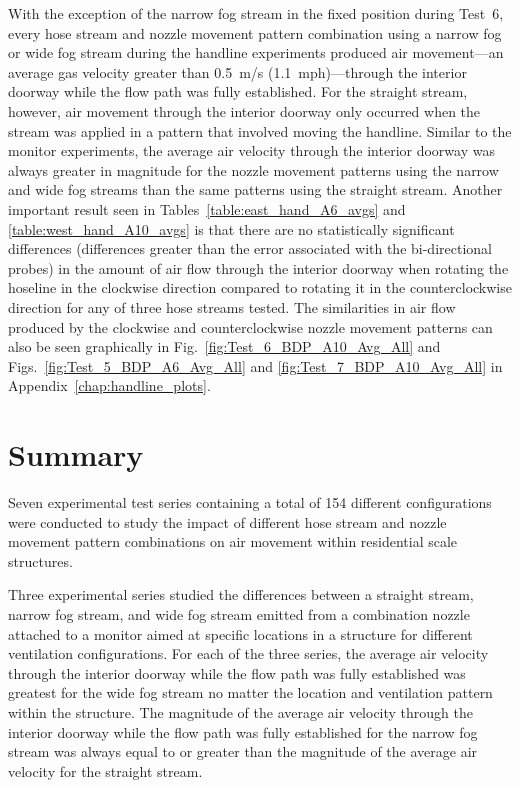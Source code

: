 \documentclass[12pt,oneside]{book}
\begin{document}
With the exception of the narrow fog stream in the fixed position during Test~6, every hose stream and nozzle movement pattern combination using a narrow fog or wide fog stream during the handline experiments produced air movement---an average gas velocity greater than 0.5~m/s (1.1~mph)---through the interior doorway while the flow path was fully established. For the straight stream, however, air movement through the interior doorway only occurred when the stream was applied in a pattern that involved moving the handline. Similar to the monitor experiments, the average air velocity through the interior doorway was always greater in magnitude for the nozzle movement patterns using the narrow and wide fog streams than the same patterns using the straight stream. Another important result seen in Tables~\ref{table:east_hand_A6_avgs} and \ref{table:west_hand_A10_avgs} is that there are no statistically significant differences (differences greater than the error associated with the bi-directional probes) in the amount of air flow through the interior doorway when rotating the hoseline in the clockwise direction compared to rotating it in the counterclockwise direction for any of three hose streams tested. The similarities in air flow produced by the clockwise and counterclockwise nozzle movement patterns can also be seen graphically in Fig.~\ref{fig:Test_6_BDP_A10_Avg_All} and Figs.~\ref{fig:Test_5_BDP_A6_Avg_All} and \ref{fig:Test_7_BDP_A10_Avg_All} in Appendix~\ref{chap:handline_plots}. 


\chapter{Summary}
\label{chap:summary}

Seven experimental test series containing a total of 154 different configurations were conducted to study the impact of different hose stream and nozzle movement pattern combinations on air movement within residential scale structures. 

Three experimental series studied the differences between a straight stream, narrow fog stream, and wide fog stream emitted from a combination nozzle attached to a monitor aimed at specific locations in a structure for different ventilation configurations. For each of the three series, the average air velocity through the interior doorway while the flow path was fully established was greatest for the wide fog stream no matter the location and ventilation pattern within the structure. The magnitude of the average air velocity through the interior doorway while the flow path was fully established for the narrow fog stream was always equal to or greater than the magnitude of the average air velocity for the straight stream. 
\end{document}
